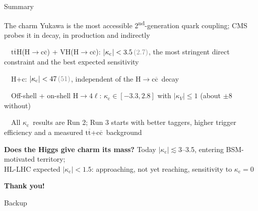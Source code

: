 \documentclass[aspectratio=169,10pt,xcolor=table]{beamer}
\newcommand{\qbar}[1]{\mathrm{#1}\overline{\mathrm{#1}}}
\newcommand{\ccbar}{\ensuremath{\qbar{c}}}
\newcommand{\kc}{\ensuremath{\kappa_\mathrm{c}}}
\newcommand{\Hcc}{\ensuremath{\mathrm{H}\to\qbar{c}}}
\newcommand{\ttH}{\ensuremath{\qbar{t}\mathrm{H}}}
\newcommand{\ttbar}{\ensuremath{\qbar{t}}}
\newcommand{\obsexp}[2]{#1\,{\color{gray}(#2)}}
\newcommand{\up}{\vspace*{-0.8em}}
\begin{document}
\begin{frame}[t]{Summary}
  \up
  \begin{keybox}[fontupper=\small]
    The charm Yukawa is the most accessible 2\textsuperscript{nd}-generation quark coupling; CMS probes it in decay, in production and indirectly
  \end{keybox}
  \vspace{3pt}
  {\small
  \ \ \ttH(\Hcc) + VH(\Hcc): \textbf{$|\kc| < \obsexp{3.5}{2.7}$}, the most stringent direct constraint and the best expected sensitivity\par\vspace{4pt}
  \ \ H+c: $|\kc|<\obsexp{47}{51}$, independent of the \Hcc\ decay\par\vspace{4pt}
  \ \ Off-shell + on-shell H$\to4\ell$: $\kc\in[-3.3,2.8]$ with $|\kappa_V|\le1$ (about $\pm8$ without)\par\vspace{4pt}
  \ \ All \kc\ results are Run 2; Run 3 starts with better taggers, higher trigger efficiency and a measured \ttbar+\ccbar\ background\par}
  \vspace{6pt}
  \begin{resultbox}[fontupper=\small]
    \textbf{Does the Higgs give charm its mass?} Today $|\kc|\lesssim3$--3.5, entering BSM-motivated territory;\\
    HL-LHC expected $|\kc|<1.5$: approaching, not yet reaching, sensitivity to $\kc=0$
  \end{resultbox}
  \vfill
  {\centering\color{accA}\large\bfseries Thank you!\par}
\end{frame}

\appendix
\begin{frame}[standout]
  Backup
\end{frame}
\end{document}
